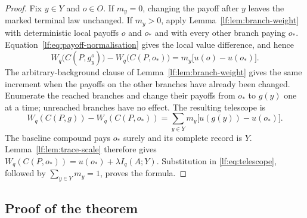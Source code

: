 \documentclass[11pt,a4paper]{article}
\theoremstyle{definition}
\newcommand{\1}{\mathbf 1}
\begin{document}
\begin{proof}
Fix $y\in Y$ and $o\in O$.
If $m_y=0$, changing the payoff after $y$ leaves the marked terminal law
unchanged.  If $m_y>0$, apply Lemma~\ref{lf:lem:branch-weight} with
deterministic local payoffs $o$ and $o_\ast$ and with every other branch paying
$o_\ast$.  Equation~\eqref{lf:eq:payoff-normalisation} gives the local value
difference, and hence
\begin{equation}
W_q\bigl(C(P,g_y^o)\bigr)
-W_q\bigl(C(P,o_\ast)\bigr)
=m_y\bigl[u(o)-u(o_\ast)\bigr].
\label{lf:eq:branch-increment}
\end{equation}
The arbitrary-background clause of Lemma~\ref{lf:lem:branch-weight} gives the
same increment when the payoffs on the other branches have already been
changed.  Enumerate the reached branches and change their payoffs from
$o_\ast$ to $g(y)$ one at a time; unreached branches have no effect.  The
resulting telescope is
\begin{equation}
W_q(C(P,g))-W_q(C(P,o_\ast))
=\sum_{y\in Y}m_y\bigl[u(g(y))-u(o_\ast)\bigr].
\label{lf:eq:telescope}
\end{equation}
The baseline compound pays $o_\ast$ surely and its complete record is $Y$.
Lemma~\ref{lf:lem:trace-scale} therefore gives
$W_q(C(P,o_\ast))=u(o_\ast)+\lambda I_q(A;Y)$.
Substitution in \eqref{lf:eq:telescope}, followed by
$\sum_{y\in Y}m_y=1$, proves the formula.
\end{proof}

\subsection{Proof of the theorem}
\end{document}
